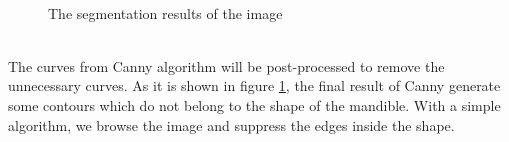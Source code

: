 \documentclass[twoside,twocolumn,10pt]{article}
\begin{document}
\begin{figure}[h]
\centering
{}~~ 
\caption{The segmentation results of the image}
\label{canny}
\end{figure}~\\
The curves from
Canny algorithm will be post-processed to remove the unnecessary
curves. As it is shown in figure \ref{canny}, the final result of Canny generate some contours which do not belong to the shape of the mandible. With a simple algorithm, we browse the image and suppress the edges inside the shape.
\end{document}
